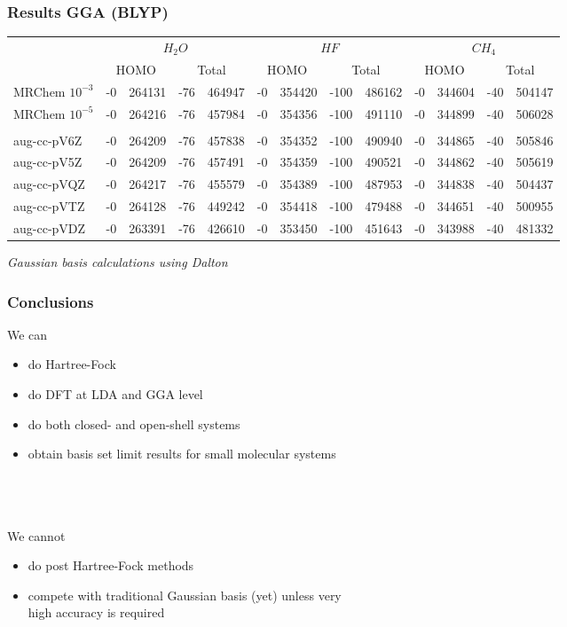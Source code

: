 \documentclass[mathserif]{beamer}
\begin{document}
\begin{frame}
	\frametitle{Results GGA (BLYP)}
	\begin{table}
		\tiny
		\centering
		\begin{tabular}{|l|r@{.}lr@{.}l|r@{.}lr@{.}l|r@{.}lr@{.}l|}
			\hline&
			\multicolumn{4}{c|}{$H_2O$}&
			\multicolumn{4}{c|}{$HF$}&
			\multicolumn{4}{c|}{$CH_4$}\\
			&
			\multicolumn{2}{c}{HOMO}&
			\multicolumn{2}{c|}{Total}&
			\multicolumn{2}{c}{HOMO}&
			\multicolumn{2}{c|}{Total}&
			\multicolumn{2}{c}{HOMO}&
			\multicolumn{2}{c|}{Total}\\
			\hline
			MRChem $10^{-3}$&
			  -0&264131&
			 -76&464947&
			  -0&354420&
			-100&486162&
			  -0&344604&
			 -40&504147\\
			MRChem $10^{-5}$&
			  -0&264216&
			 -76&457984&
			  -0&354356&
			-100&491110&
			  -0&344899&
			 -40&506028\\
			&\multicolumn{4}{c|}{}&
			\multicolumn{4}{c|}{}&
			\multicolumn{4}{c|}{}\\
			aug-cc-pV6Z&
			  -0&264209&
			 -76&457838&
			  -0&354352&
			-100&490940&
			  -0&344865&
			 -40&505846\\
			aug-cc-pV5Z&
			  -0&264209&
			 -76&457491&
			  -0&354359&
			-100&490521&
			  -0&344862&
			 -40&505619\\
			aug-cc-pVQZ&
			  -0&264217&
			 -76&455579&
			  -0&354389&
			-100&487953&
			  -0&344838&
			 -40&504437\\
			aug-cc-pVTZ&
			  -0&264128&
			 -76&449242&
			  -0&354418&
			-100&479488&
			  -0&344651&
			 -40&500955\\
			aug-cc-pVDZ&
			  -0&263391&
			 -76&426610&
			  -0&353450&
			-100&451643&
			  -0&343988&
			 -40&481332\\
			\hline
		\end{tabular}
	\end{table}
	\tiny
	\it{Gaussian basis calculations using Dalton}\\
\end{frame}

\begin{frame}
    \frametitle{Conclusions}
    We can
    \begin{itemize}
	\item do Hartree-Fock
	\item do DFT at LDA and GGA level
	\item do both closed- and open-shell systems
	\item obtain basis set limit results for small molecular systems
    \end{itemize}
    \ \\
    \ \\
    \ \\
    \pause
    We cannot
    \begin{itemize}
	\item do post Hartree-Fock methods
	\item compete with traditional Gaussian basis (yet) unless very \\
		high accuracy is required 
    \end{itemize}
\end{frame}
\end{document}

